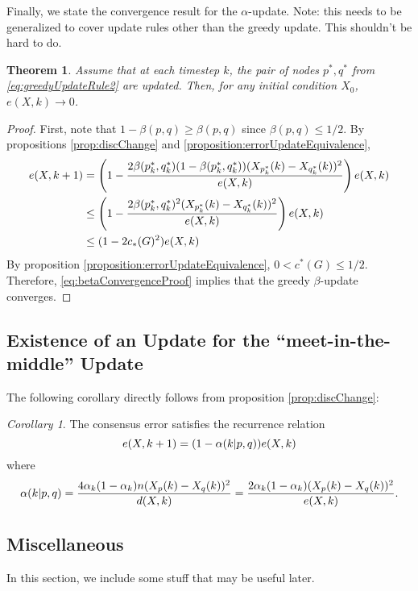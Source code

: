 \documentclass{article}
\newtheorem{theorem}{Theorem}
\theoremstyle{remark}
\newtheorem{corollary}{Corollary}
\begin{document}
Finally, we state the convergence result for the $\alpha$-update. Note: this needs to be generalized to cover update rules other than the greedy update. This shouldn't be hard to do.
\begin{theorem}{\label{theorem:betaConvergence}}
	Assume that at each timestep $k$, the pair of nodes $p^*,q^*$ from \eqref{eq:greedyUpdateRule2} are updated.  Then, for any initial condition $X_0$, $e(X,k)\to0$.
\end{theorem}
\begin{proof}
	First, note that $1-\beta(p,q) \geq \beta(p,q)$ since $\beta(p,q)\leq1/2$. By propositions \ref{prop:discChange} and \ref{proposition:errorUpdateEquivalence},
	\begin{align}{\label{eq:betaConvergenceProof}}
		e(X,k+1) &= \left(1-\frac{2\beta(p_k^*,q_k^*)(1-\beta(p_k^*,q_k^*))(X_{p_k^*}(k)-X_{q_{k}^*}(k))^2}{e(X,k)}\right)e(X,k)\\
			 &\leq \left(1-\frac{2\beta(p_k^*,q_k^*)^2(X_{p_k^*}(k)-X_{q_{k}^*}(k))^2}{e(X,k)}\right)e(X,k)\\
			 &\leq (1-2c_*(G)^2)e(X,k)
	\end{align}
	By proposition \ref{proposition:errorUpdateEquivalence}, $0<c^*(G)\leq 1/2$.  Therefore, \eqref{eq:betaConvergenceProof} implies that the greedy $\beta$-update converges.
\end{proof}

\subsection{Existence of an Update for the ``meet-in-the-middle'' Update}

The following corollary directly follows from proposition \ref{prop:discChange}:
\begin{corollary}{\label{cor:recurrenceRelation}}
The consensus error satisfies the recurrence relation
\begin{equation}{\label{eq:discordanceRecurrence}}
e(X,k+1)=(1-\alpha(k|p,q))e(X,k)
\end{equation}
where
\begin{equation}{\label{eq:alphaDefn}}
	\alpha(k|p,q) = \frac{4\alpha_k(1-\alpha_k)n(X_p(k)-X_q(k))^2}{d(X,k)} = \frac{2\alpha_k(1-\alpha_k)(X_p(k)-X_q(k))^2}{e(X,k)}.
\end{equation}
\end{corollary}

\subsection{Miscellaneous}
In this section, we include some stuff that may be useful later.
\end{document}
